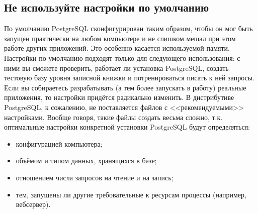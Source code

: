\subsection{Не используйте настройки по умолчанию}
По умолчанию PostgreSQL сконфигурирован таким образом, чтобы он мог быть запущен практически 
на любом компьютере и не слишком мешал при этом работе других приложений. Это особенно касается используемой памяти. 
Настройки по умолчанию подходят только для следующего использования:
с ними вы сможете проверить, работает ли установка PostgreSQL, создать тестовую базу 
уровня записной книжки и потренироваться писать к ней запросы.
Если вы собираетесь разрабатывать (а тем более запускать в работу) реальные 
приложения, то настройки придётся радикально изменить.
В дистрибутиве PostgreSQL, к сожалению, не поставляется файлов с <<рекомендуемыми>> настройками. 
Вообще говоря, такие файлы создать весьма сложно, т.к. оптимальные настройки конкретной 
установки PostgreSQL будут определяться:
\begin{itemize}
\item конфигурацией компьютера;
\item объёмом и типом данных, хранящихся в базе;
\item отношением числа запросов на чтение и на запись;
\item тем, запущены ли другие требовательные к ресурсам процессы (например, вебсервер).
\end{itemize}

